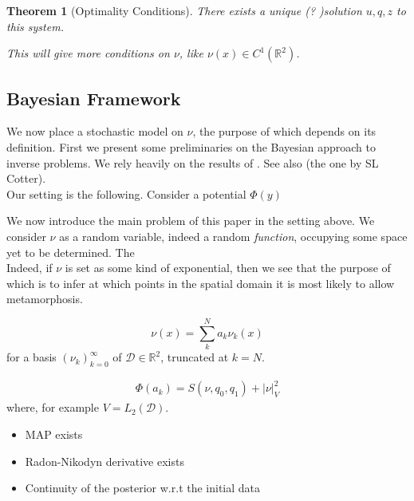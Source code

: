 \documentclass{article}
\newtheorem{theorem}{Theorem}
\begin{document}
\begin{theorem}[Optimality Conditions]
There exists a unique (? )solution $u, q, z$ to this system.

This will give more conditions on $\nu$, like $\nu(x) \in C^{1}(\mathbb R^2)$. 
\end{theorem}

\subsection{Bayesian Framework}\label{sec:bayesian}

We now place a stochastic model on $\nu$, the purpose of which depends on its
definition. First we present some preliminaries on the Bayesian approach to
inverse problems. We rely heavily on the results of \cite{dashti2017bayesian}.
See also (the one by SL Cotter).\\

Our setting is the following. Consider a potential $\Phi(y)$ 

We now introduce the main problem of this paper in the setting above. We
consider $\nu$ as a random variable, indeed a random \emph{function}, occupying
some space yet to be determined. The \\

Indeed, if $\nu$ is set as some kind of exponential, then we
see that 
the purpose of which is to infer at
which points in the spatial domain it is most likely to allow metamorphosis.
%

\begin{equation}\label{finite_dim_nu}
	\nu(x) = \sum_k^N a_k \nu_k(x)
\end{equation}
for a basis $(\nu_k)_{k=0}^\infty$ of $\mathcal D \in \mathbb R^2$, truncated at $k=N$.  

\begin{align}
	\Phi(a_k) = S(\nu,q_0,q_1) + |\nu|_V^2
\end{align}
where, for example $ V = {L_2(\mathcal D)}$. 

\begin{itemize}
	\item MAP exists
	\item Radon-Nikodyn derivative exists
	\item Continuity of the posterior w.r.t the initial data 
\end{itemize}
\end{document}
